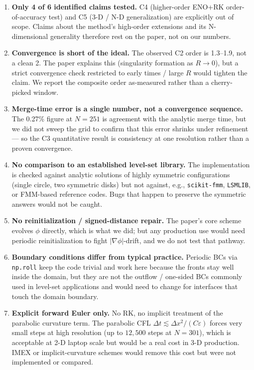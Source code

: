 \documentclass[11pt]{article}
\begin{document}
\begin{enumerate}
\item \textbf{Only 4 of 6 identified claims tested.} C4 (higher-order
ENO+RK order-of-accuracy test) and C5 (3-D / N-D generalization) are
explicitly out of scope. Claims about the method's high-order
extensions and its N-dimensional generality therefore rest on the
paper, not on our numbers.

\item \textbf{Convergence is short of the ideal.} The observed C2 order
is 1.3--1.9, not a clean 2. The paper explains this (singularity
formation as $R\to 0$), but a strict convergence check restricted to
early times / large $R$ would tighten the claim. We report the
composite order as-measured rather than a cherry-picked window.

\item \textbf{Merge-time error is a single number, not a convergence
sequence.} The 0.27\% figure at $N=251$ is agreement with the analytic
merge time, but we did not sweep the grid to confirm that this error
shrinks under refinement --- so the C3 quantitative result is
consistency at one resolution rather than a proven convergence.

\item \textbf{No comparison to an established level-set library.} The
implementation is checked against analytic solutions of highly
symmetric configurations (single circle, two symmetric disks) but not
against, e.g., \texttt{scikit-fmm}, \texttt{LSMLIB}, or FMM-based
reference codes. Bugs that happen to preserve the symmetric answers
would not be caught.

\item \textbf{No reinitialization / signed-distance repair.} The paper's
core scheme evolves $\phi$ directly, which is what we did; but any
production use would need periodic reinitialization to fight
$|\nabla\phi|$-drift, and we do not test that pathway.

\item \textbf{Boundary conditions differ from typical practice.}
Periodic BCs via \texttt{np.roll} keep the code trivial and work here
because the fronts stay well inside the domain, but they are not the
outflow / one-sided BCs commonly used in level-set applications and
would need to change for interfaces that touch the domain boundary.

\item \textbf{Explicit forward Euler only.} No RK, no implicit
treatment of the parabolic curvature term. The parabolic CFL
$\Delta t \lesssim \Delta x^{2}/(C\varepsilon)$ forces very small steps
at high resolution (up to $12{,}500$ steps at $N=301$), which is
acceptable at 2-D laptop scale but would be a real cost in 3-D
production. IMEX or implicit-curvature schemes would remove this cost
but were not implemented or compared.


\end{enumerate}
\end{document}
